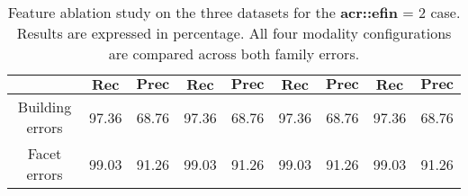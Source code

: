 \begin{table}[htbp]
\begin{tabular}{|c | c c | c c | c c | c c |}
                \cline{2-9}
                & \(\bm{Rec}\) & \(\bm{Prec}\) &  \(\bm{Rec}\) & \(\bm{Prec}\) &  \(\bm{Rec}\) & \(\bm{Prec}\) &  \(\bm{Rec}\) & \(\bm{Prec}\) \\
                \hline
                Building errors & 97.36 & 68.76 & 97.36 & 68.76 & 97.36 & 68.76 & 97.36 & 68.76 \\
                \hline
                Facet errors & 99.03 & 91.26 & 99.03 & 91.26 & 99.03 & 91.26 & 99.03 & 91.26 \\
                \hline
            \end{tabular}
            \caption{
                \label{tab::ablation_f2}
                Feature ablation study on the three datasets for the \textbf{\gls{acr::efin}} = 2 case.
                Results are expressed in percentage.
                All four modality configurations are compared across both family errors.
            }
        \end{table}
    
        \begin{figure}[htbp]
        \end{figure}
    
